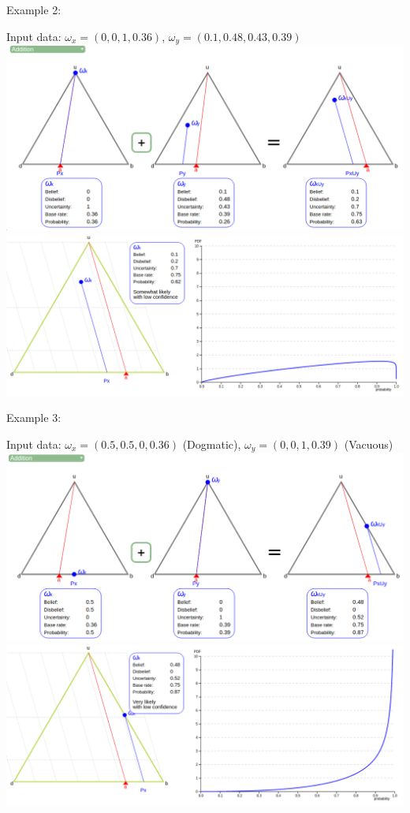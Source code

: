 \documentclass[UTF8]{article}
\newcommand{\opinion}[5]{$\omega_{#1} = (#2, #3, #4, #5)$}
\begin{document}
Example 2:
    \begin{center}
        Input data: 
        \opinion{x}{0}{0}{1}{0.36}, 
        \opinion{y}{0.1}{0.48}{0.43}{0.39}\\
        \includegraphics[width=6in]{images/add2.png}
        \includegraphics[width=6in]{images/add2viz.png}
    \end{center}
Example 3:
    \begin{center}
        Input data: 
        \opinion{x}{0.5}{0.5}{0}{0.36} (Dogmatic), 
        \opinion{y}{0}{0}{1}{0.39} (Vacuous)\\
        \includegraphics[width=6in]{images/add3.png}
        \includegraphics[width=6in]{images/add3viz.png}
    \end{center}
\end{document}
